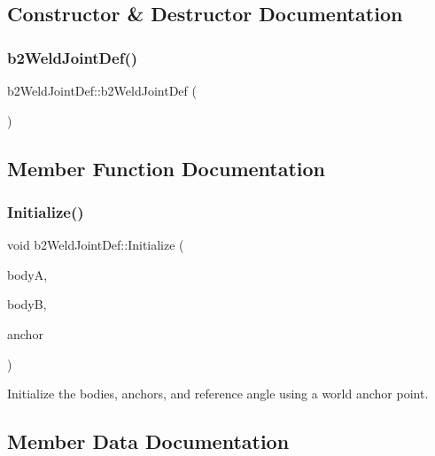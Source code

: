 \subsection{Constructor \& Destructor Documentation}
\mbox{\label{structb2_weld_joint_def_a18f4a2f33109edc37a3a977c6296bc31}} 
\subsubsection{\texorpdfstring{b2WeldJointDef()}{b2WeldJointDef()}}
{\footnotesize\ttfamily b2\+Weld\+Joint\+Def\+::b2\+Weld\+Joint\+Def (\begin{DoxyParamCaption}{ }\end{DoxyParamCaption})\hspace{0.3cm}{\ttfamily [inline]}}



\subsection{Member Function Documentation}
\mbox{\label{structb2_weld_joint_def_a9f6592c2a7eba6ce6e07e40c4e82aab5}} 
\subsubsection{\texorpdfstring{Initialize()}{Initialize()}}
{\footnotesize\ttfamily void b2\+Weld\+Joint\+Def\+::\+Initialize (\begin{DoxyParamCaption}\item[{\mbox{\hyperlink{classb2_body}{b2\+Body}} $\ast$}]{bodyA,  }\item[{\mbox{\hyperlink{classb2_body}{b2\+Body}} $\ast$}]{bodyB,  }\item[{const \mbox{\hyperlink{structb2_vec2}{b2\+Vec2}} \&}]{anchor }\end{DoxyParamCaption})}

Initialize the bodies, anchors, and reference angle using a world anchor point. 

\subsection{Member Data Documentation}
\mbox{\label{structb2_weld_joint_def_ace1f0131610f14558f3dbaaed7b10e24}} 
